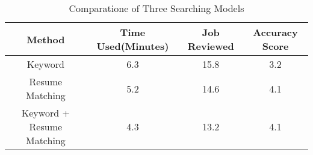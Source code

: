 \begin{table}[ht]
\caption{Comparatione of Three Searching Models } %
\centering %
\begin{tabular}{  | c | c | c | c | }
 \hline
 Method                    &  Time Used(Minutes)    & Job Reviewed & Accuracy Score  \\
 \hline
 Keyword                   & 6.3                    & 15.8         &       3.2         \\
 \hline
 Resume Matching           & 5.2                    & 14.6         &       4.1         \\
  \hline
 Keyword + Resume Matching & 4.3                    & 13.2         &       4.1       \\
  \hline
\end{tabular}
\label{tab:methodcompare} %
\end{table}

